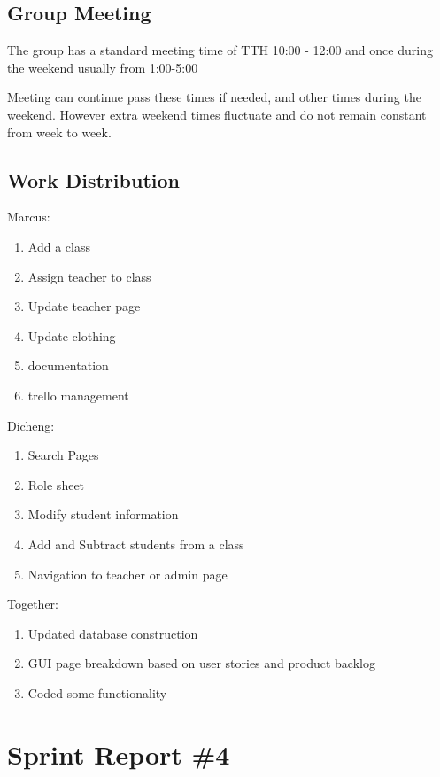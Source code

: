 \subsection{Group Meeting}

The group has a standard meeting time of TTH 10:00 - 12:00 and once during the weekend usually from 1:00-5:00 

Meeting can continue pass these times if needed, and other times during the weekend. However extra weekend times fluctuate and do not remain constant from week to week. 

\subsection{Work Distribution}

Marcus:
\begin{enumerate}
\item Add a class
\item Assign teacher to class
\item Update teacher page
\item Update clothing
\item documentation
\item trello management\\
\end{enumerate}

Dicheng:
\begin{enumerate}
\item Search Pages
\item Role sheet
\item Modify student information
\item Add and Subtract students from a class
\item Navigation to teacher or admin page\\
\end{enumerate}


Together:
\begin{enumerate}
\item Updated database construction
\item GUI page breakdown based on user stories and product backlog
\item Coded some functionality
\end{enumerate}

\section{Sprint Report \#4}

